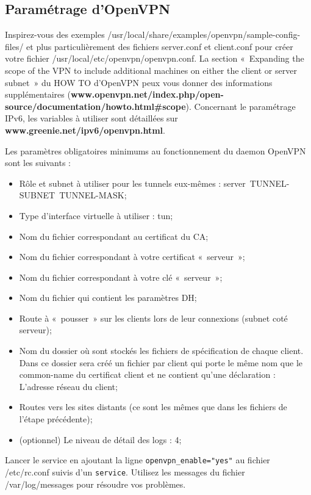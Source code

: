 \documentclass[a4paper,11pt]{article}
\newcommand{\shellcmd}[1]{\texttt{#1}}
\begin{document}
\subsection{Paramétrage d'OpenVPN}
Inspirez-vous des exemples /usr/local/share/examples/openvpn/sample-config-files/ et plus particulièrement des fichiers server.conf et client.conf pour créer votre fichier /usr/local/etc/openvpn/openvpn.conf.
La section «~Expanding the scope of the VPN to include additional machines on either the client or server subnet~» du HOW TO d'OpenVPN peux vous donner des informations supplémentaires (\textbf{www.openvpn.net/index.php/open-source/documentation/howto.html\#scope}).
Concernant le paramétrage IPv6, les variables à utiliser sont détaillées sur \textbf{www.greenie.net/ipv6/openvpn.html}.

Les paramètres obligatoires minimums au fonctionnement du daemon OpenVPN sont les suivants :
\begin{itemize}
\item Rôle et subnet à utiliser pour les tunnels eux-mêmes : server~TUNNEL-SUBNET~TUNNEL-MASK;
\item Type d'interface virtuelle à utiliser : tun;
\item Nom du fichier correspondant au certificat du CA;
\item Nom du fichier correspondant à votre certificat «~serveur~»;
\item Nom du fichier correspondant à votre clé «~serveur~»;
\item Nom du fichier qui contient les paramètres DH;
\item Route à «~pousser~» sur les clients lors de leur connexions (subnet coté serveur);
\item Nom du dossier où sont stockés les fichiers de spécification de chaque client. Dans ce dossier sera créé un fichier par client qui porte le même nom que le common-name du certificat client et ne contient qu'une déclaration : L'adresse réseau du client;
\item Routes vers les sites distants (ce sont les mêmes que dans les fichiers de l'étape précédente);
\item (optionnel) Le niveau de détail des logs : 4;
\end{itemize}

Lancer le service en ajoutant la ligne \shellcmd{openvpn\_enable="yes"} au fichier /etc/rc.conf suivis d'un \shellcmd{service}. Utilisez les messages du fichier /var/log/messages pour résoudre vos problèmes.
\end{document}
